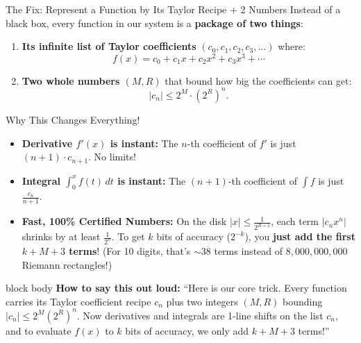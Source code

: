\documentclass[aspectratio=169,11pt]{beamer}
\newcommand{\say}[1]{%
  \vfill
  \begin{beamercolorbox}[sep=5pt,rounded=true,shadow=false]{block body}
  {\footnotesize \textbf{\textcolor{deepblue}{How to say this out loud:}} ``#1''}
  \end{beamercolorbox}
}
\begin{document}
\begin{frame}[shrink=6]{The Fix: Represent a Function by Its Taylor Recipe + 2 Numbers}
  Instead of a black box, every function in our system is a \textbf{package of two things}:
  \begin{enumerate}
    \item \textbf{Its infinite list of Taylor coefficients} $(c_0, c_1, c_2, c_3, \dots)$ where:
      $$f(x) = c_0 + c_1 x + c_2 x^2 + c_3 x^3 + \cdots$$
    \item \textbf{Two whole numbers $(M, R)$} that bound how big the coefficients can get:
      $$|c_n| \le 2^M \cdot (2^R)^n.$$
  \end{enumerate}

  \begin{block}{Why This Changes Everything!}
    \footnotesize
    \begin{itemize}
      \item \textbf{Derivative $f'(x)$ is instant:} The $n$-th coefficient of $f'$ is just $(n+1)\cdot c_{n+1}$. No limits!
      \item \textbf{Integral $\int_0^x f(t)\,dt$ is instant:} The $(n+1)$-th coefficient of $\int f$ is just $\frac{c_n}{n+1}$.
      \item \textbf{Fast, 100\% Certified Numbers:} On the disk $|x| \le \frac{1}{2^{R+1}}$, each term $|c_n x^n|$ shrinks by at least $\frac{1}{2^n}$. To get $k$ bits of accuracy ($2^{-k}$), you \textbf{just add the first $k + M + 3$ terms}! (For 10 digits, that's $\sim 38$ terms instead of $8{,}000{,}000{,}000$ Riemann rectangles!)
    \end{itemize}
  \end{block}

  \say{Here is our core trick. Every function carries its Taylor coefficient recipe $c_n$ plus two integers $(M, R)$ bounding $|c_n| \le 2^M(2^R)^n$. Now derivatives and integrals are 1-line shifts on the list $c_n$, and to evaluate $f(x)$ to $k$ bits of accuracy, we only add $k + M + 3$ terms!}
\end{frame}
\end{document}
